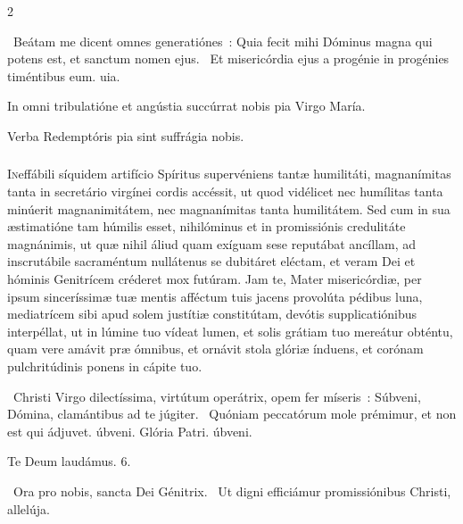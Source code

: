 \documentclass[9pt,twoside]{extarticle}
\begin{document}
\begin{multicols}{2}
\begin{tightlist}{}
\item {}~Beátam me dicent omnes generatiónes~: \textred{*} Quia fecit mihi Dóminus magna qui potens est, et sanctum nomen ejus.
~Et misericórdia ejus a progénie in progénies timéntibus eum. uia.
\end{tightlist}

\begin{tightlist}
\item {\small {} In omni tribulatióne et angústia succúrrat nobis pia Virgo María.
\item {}
\item {} Verba Redemptóris pia sint suffrágia nobis.}
\end{tightlist}

\subsubsection*{\center {}}
\lettrine{I}neffábili síquidem artifício Spíritus supervéniens tantæ humilitáti, magnanímitas tanta in secretário virgínei cordis accéssit, ut quod vidélicet nec humílitas tanta minúerit magnanimitátem, nec magnanímitas tanta humilitátem. Sed cum in sua æstimatióne tam húmilis esset, nihilóminus et in promissiónis credulitáte magnánimis, ut quæ nihil áliud quam exíguam sese reputábat ancíllam, ad inscrutábile sacraméntum nullátenus se dubitáret eléctam, et veram Dei et hóminis Genitrícem créderet mox futúram. Jam te, Mater misericórdiæ, per ipsum sinceríssimæ tuæ mentis afféctum tuis jacens provolúta pédibus luna, mediatrícem sibi apud solem justítiæ constitútam, devótis supplicatiónibus interpéllat, ut in lúmine tuo vídeat lumen, et solis grátiam tuo mereátur obténtu, quam vere amávit præ ómnibus, et ornávit stola glóriæ índuens, et corónam pulchritúdinis ponens in cápite tuo.

\begin{tightlist}{}
\item {}~Christi Virgo dilectíssima, virtútum operátrix, opem fer míseris~: \textred{*} Súbveni, Dómina, clamántibus ad te júgiter. ~Quóniam peccatórum mole prémimur, et non est qui ádjuvet. úbveni. Glória Patri. úbveni.
\item Te Deum laudámus. 6.
\item {}~Ora pro nobis, sancta Dei Génitrix. ~Ut digni efficiámur promissiónibus Christi, allelúja.
\end{tightlist}


\end{multicols}
\end{document}
